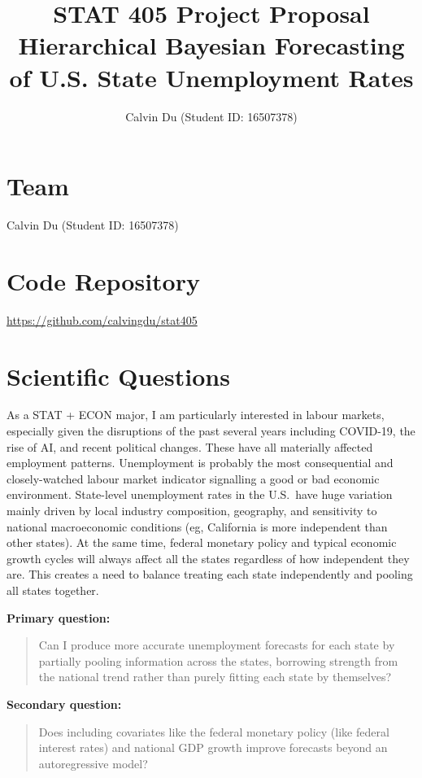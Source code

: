 \documentclass[11pt]{article}
\title{
  \textbf{STAT 405 Project Proposal} \\[0.4em]
  Hierarchical Bayesian Forecasting of U.S. State Unemployment Rates
}
\author{Calvin Du (Student ID: 16507378)}
\begin{document}
\maketitle

\section{Team}

Calvin Du (Student ID: 16507378)

\section{Code Repository}

\url{https://github.com/calvingdu/stat405}

\section{Scientific Questions}

As a STAT + ECON major, I am particularly interested in labour markets,
especially given the disruptions of the past several years including COVID-19,
the rise of AI, and recent political changes. These have all materially affected
employment patterns. Unemployment is probably the most consequential and
closely-watched labour market indicator signalling a good or bad economic environment.
State-level unemployment rates in the U.S.\ have huge variation mainly driven by 
local industry composition, geography, and sensitivity to national 
macroeconomic conditions (eg, California is more independent than other states). 
At the same time, federal monetary policy and typical economic growth cycles will always
affect all the states regardless of how independent they are. This creates a 
need to balance treating each state independently and pooling all states together.

\textbf{Primary question:}
\begin{quote}
Can I produce more accurate unemployment forecasts for each state by 
partially pooling information across the states, borrowing strength from 
the national trend rather than purely fitting each state by themselves?
\end{quote}

\textbf{Secondary question:}
\begin{quote}
Does including covariates like the federal monetary policy (like federal interest rates) 
and national GDP growth improve forecasts beyond an autoregressive model? 
\end{quote}
\end{document}
